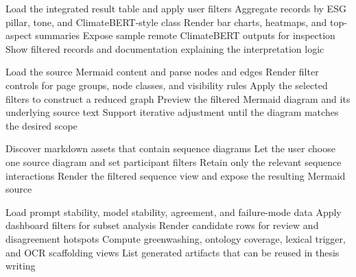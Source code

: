 \begin{algorithm}[H]
Load the integrated result table and apply user filters\;
Aggregate records by ESG pillar, tone, and ClimateBERT-style class\;
Render bar charts, heatmaps, and top-aspect summaries\;
Expose sample remote ClimateBERT outputs for inspection\;
Show filtered records and documentation explaining the interpretation logic\;
\caption{Tone versus ClimateBERT Visualization}
\label{alg:tone-climatebert-visualization}
\end{algorithm}

\begin{algorithm}[H]
Load the source Mermaid content and parse nodes and edges\;
Render filter controls for page groups, node classes, and visibility rules\;
Apply the selected filters to construct a reduced graph\;
Preview the filtered Mermaid diagram and its underlying source text\;
Support iterative adjustment until the diagram matches the desired scope\;
\caption{Mermaid Filter Studio}
\label{alg:mermaid-filter-studio}
\end{algorithm}

\begin{algorithm}[H]
Discover markdown assets that contain sequence diagrams\;
Let the user choose one source diagram and set participant filters\;
Retain only the relevant sequence interactions\;
Render the filtered sequence view and expose the resulting Mermaid source\;
\caption{Mermaid Sequence Filter Studio}
\label{alg:mermaid-sequence-filter-studio}
\end{algorithm}

\begin{algorithm}[H]
Load prompt stability, model stability, agreement, and failure-mode data\;
Apply dashboard filters for subset analysis\;
Render candidate rows for review and disagreement hotspots\;
Compute greenwashing, ontology coverage, lexical trigger, and OCR scaffolding views\;
List generated artifacts that can be reused in thesis writing\;
\caption{Revision Analytics Dashboard}
\label{alg:revision-analytics}
\end{algorithm}

